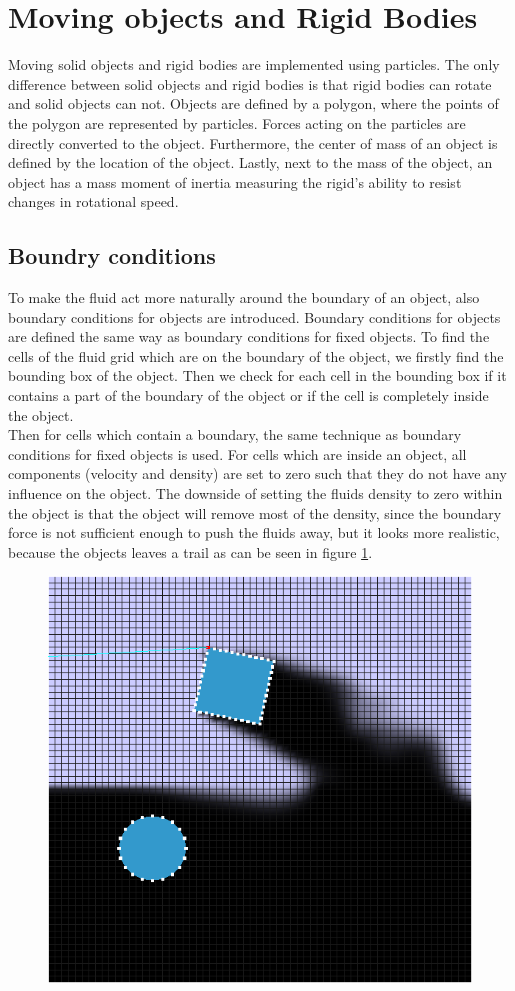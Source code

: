 \section{Moving objects and Rigid Bodies}
Moving solid objects and rigid bodies are implemented using particles. The only difference between solid objects and rigid bodies is that rigid bodies can rotate and solid objects can not. Objects are defined by a polygon, where the points of the polygon are represented by particles. Forces acting on the particles are directly converted to the object. Furthermore, the center of mass of an object is defined by the location of the object. Lastly, next to the mass of the object, an object has a mass moment of inertia measuring the rigid's ability to resist changes in rotational speed.

\subsection{Boundry conditions}
To make the fluid act more naturally around the boundary of an object, also boundary conditions for objects are introduced. Boundary conditions for objects are defined the same way as boundary conditions for fixed objects. To find the cells of the fluid grid which are on the boundary of the object, we firstly find the bounding box of the object. Then we check for each cell in the bounding box if it contains a part of the boundary of the object or if the cell is completely inside the object.\\
Then for cells which contain a boundary, the same technique as boundary conditions for fixed objects is used. For cells which are inside an object, all components (velocity and density) are set to zero such that they do not have any influence on the object. The downside of setting the fluids density to zero within the object is that the object will remove most of the density, since the boundary force is not sufficient enough to push the fluids away, but it looks more realistic, because the objects leaves a trail as can be seen in figure \ref{fig:trail}.

\begin{figure}[!htb]
\centering
  \includegraphics[height=0.5\textwidth]{img/trail}
  \label{fig:trail}
\end{figure}


